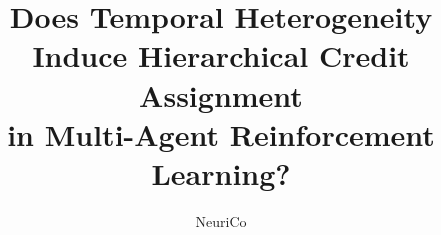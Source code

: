 \documentclass{article}
\title{Does Temporal Heterogeneity Induce Hierarchical Credit Assignment\\in Multi-Agent Reinforcement Learning?}
\author{NeuriCo}
\begin{document}
\maketitle

\begin{abstract}

\end{abstract}










\end{document}
